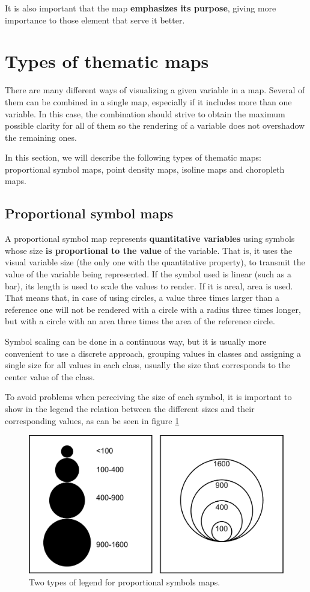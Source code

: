 It is also important that the map \textbf{emphasizes its purpose}, giving more importance to those element that serve it better.

\section{Types of thematic maps}

There are many different ways of visualizing a given variable in a map. Several of them can be combined in a single map, especially if it includes more than one variable. In this case, the combination should strive to obtain the maximum possible clarity for all of them so the rendering of a variable does not overshadow the remaining ones.

In this section, we will describe the following types of thematic maps: proportional symbol maps, point density maps, isoline maps and choropleth maps.


\subsection{Proportional symbol maps}

A proportional symbol map represents \textbf{quantitative variables} using symbols whose size \textbf{is proportional to the value} of the variable. That is, it uses the visual variable size (the only one with the quantitative property), to transmit the value of the variable being represented. If the symbol used is linear (such as a bar), its length is used to scale the values to render. If it is areal, area is used. That means that, in case of using circles, a value three times larger than a reference one will not be rendered with a circle with a radius three times longer, but with a circle with an area three times the area of the reference circle.

Symbol scaling can be done in a continuous way, but it is usually more convenient to use a discrete approach, grouping values in classes and assigning a single size for all values in each class, usually the size that corresponds to the center value of the class. 

To avoid problems when perceiving the size of each symbol, it is important to show in the legend the relation between the different sizes and their corresponding values, as can be seen in figure \ref{Fig:LegendProportionalSymbols}

\begin{figure}[!hbt]
\centering
\includegraphics[width=.65\columnwidth]{Visualization/LegendProportionalSymbols.pdf}
\caption{\small Two types of legend for proportional symbols maps.}
\label{Fig:LegendProportionalSymbols} 
\end{figure}


